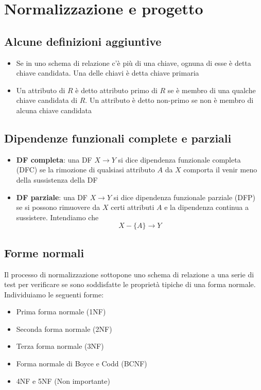 \section{Normalizzazione e progetto}

\subsection{Alcune definizioni aggiuntive}
\begin{itemize}
	\item Se in uno schema di relazione c'è più di una chiave, ognuna di esse è detta chiave candidata. Una delle chiavi è detta chiave primaria
	\item Un attributo di $R$ è detto attributo primo di $R$ se è membro di una qualche chiave candidata di $R$. Un attributo è detto non-primo se non è membro di alcuna chiave candidata
\end{itemize}
\subsection{Dipendenze funzionali complete e parziali}
\begin{itemize}
	\item \textbf{DF completa}: una DF $X \to Y$ si dice dipendenza funzionale completa (DFC) se la rimozione di qualsiasi attributo $A$ da $X$ comporta il venir meno della sussistenza della DF
	\item \textbf{DF parziale}: una DF $X \to Y$ si dice dipendenza funzionale parziale (DFP) se si possono rimuovere da $X$ certi attributi $A$ e la dipendenza continua a sussistere. Intendiamo che
	\[X-\{A\} \to Y\]
\end{itemize}
\subsection{Forme normali}
Il processo di normalizzazione sottopone uno schema di relazione a una serie di test per verificare se sono soddisfatte le proprietà tipiche di una forma normale. Individuiamo le seguenti forme:
\begin{itemize}
	\item Prima forma normale (1NF)
	\item Seconda forma normale (2NF)
	\item Terza forma normale (3NF)
	\item Forma normale di Boyce e Codd (BCNF)
	\item 4NF e 5NF (Non importante)
\end{itemize}
